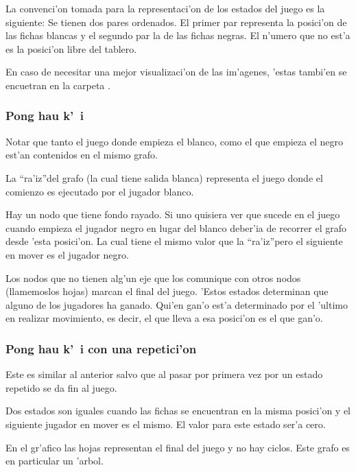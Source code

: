 La convenci'on tomada para la representaci'on de los estados del juego es la siguiente: Se tienen dos pares ordenados. El primer par representa la posici'on de las fichas blancas y el segundo par la de las fichas negras. El n'umero que no est'a es la posici'on libre del tablero.

En caso de necesitar una mejor visualizaci'on de las im'agenes, 'estas tambi'en se encuetran en la carpeta .

\subsubsection{Pong hau k'\ i}

Notar que tanto el juego donde empieza el blanco, como el que empieza el negro est'an contenidos en el mismo grafo.

La \textquotedblleft ra'iz\textquotedblright  del grafo (la cual tiene salida blanca) representa el juego donde el comienzo es ejecutado por el jugador blanco.

Hay un nodo que tiene fondo rayado. Si uno quisiera ver que sucede en el juego cuando empieza el jugador negro en lugar del blanco deber'ia de recorrer el grafo desde 'esta posici'on. La cual tiene el mismo valor que la \textquotedblleft ra'iz\textquotedblright pero el siguiente en mover es el jugador negro.

Los nodos que no tienen alg'un eje que los comunique con otros nodos (llamemoslos hojas) marcan el final del juego. 'Estos estados determinan que alguno de los jugadores ha ganado. Qui'en gan'o est'a determinado por el 'ultimo en realizar movimiento, es decir, el que lleva a esa posici'on es el que gan'o.

\clearpage

\subsubsection{Pong hau k'\ i con una repetici'on}

Este es similar al anterior salvo que al pasar por primera vez por un estado repetido se da fin al juego.

Dos estados son iguales cuando las fichas se encuentran en la misma posici'on y el siguiente jugador en mover es el mismo. El valor para este estado ser'a cero.

En el gr'afico las hojas representan el final del juego y no hay ciclos. Este grafo es en particular un 'arbol.

